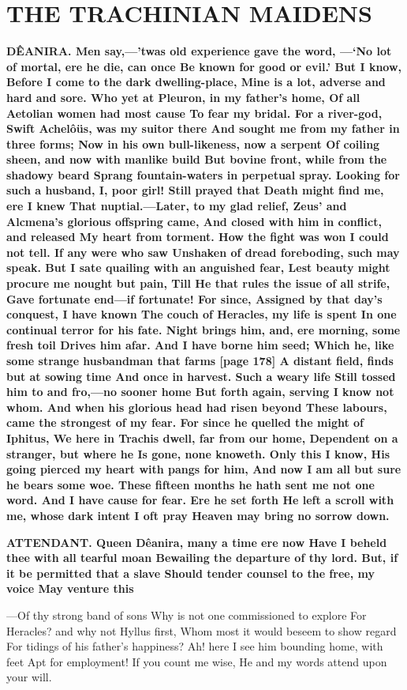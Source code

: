 \documentclass[11pt,letter]{book}
\begin{document}
\section{THE TRACHINIAN MAIDENS}
\par \textbf{DÊANIRA. Men say,—’twas old experience gave the word, —‘No lot of mortal, ere he die, can once Be known for good or evil.’ But I know, Before I come to the dark dwelling-place, Mine is a lot, adverse and hard and sore. Who yet at Pleuron, in my father’s home, Of all Aetolian women had most cause To fear my bridal. For a river-god, Swift Achelôüs, was my suitor there And sought me from my father in three forms; Now in his own bull-likeness, now a serpent Of coiling sheen, and now with manlike build But bovine front, while from the shadowy beard Sprang fountain-waters in perpetual spray. Looking for such a husband, I, poor girl! Still prayed that Death might find me, ere I knew That nuptial.—Later, to my glad relief, Zeus’ and Alcmena’s glorious offspring came, And closed with him in conflict, and released My heart from torment. How the fight was won I could not tell. If any were who saw Unshaken of dread foreboding, such may speak. But I sate quailing with an anguished fear, Lest beauty might procure me nought but pain, Till He that rules the issue of all strife, Gave fortunate end—if fortunate! For since, Assigned by that day’s conquest, I have known The couch of Heracles, my life is spent In one continual terror for his fate. Night brings him, and, ere morning, some fresh toil Drives him afar. And I have borne him seed; Which he, like some strange husbandman that farms [page 178] A distant field, finds but at sowing time And once in harvest. Such a weary life Still tossed him to and fro,—no sooner home But forth again, serving I know not whom. And when his glorious head had risen beyond These labours, came the strongest of my fear. For since he quelled the might of Iphitus, We here in Trachis dwell, far from our home, Dependent on a stranger, but where he Is gone, none knoweth. Only this I know, His going pierced my heart with pangs for him, And now I am all but sure he bears some woe. These fifteen months he hath sent me not one word. And I have cause for fear. Ere he set forth He left a scroll with me, whose dark intent I oft pray Heaven may bring no sorrow down.}
\par 

\par \textbf{ATTENDANT. Queen Dêanira, many a time ere now Have I beheld thee with all tearful moan Bewailing the departure of thy lord. But, if it be permitted that a slave Should tender counsel to the free, my voice May venture this}
\par  —Of thy strong band of sons Why is not one commissioned to explore For Heracles? and why not Hyllus first, Whom most it would beseem to show regard For tidings of his father’s happiness? Ah! here I see him bounding home, with feet Apt for employment! If you count me wise, He and my words attend upon your will.
\end{document}
